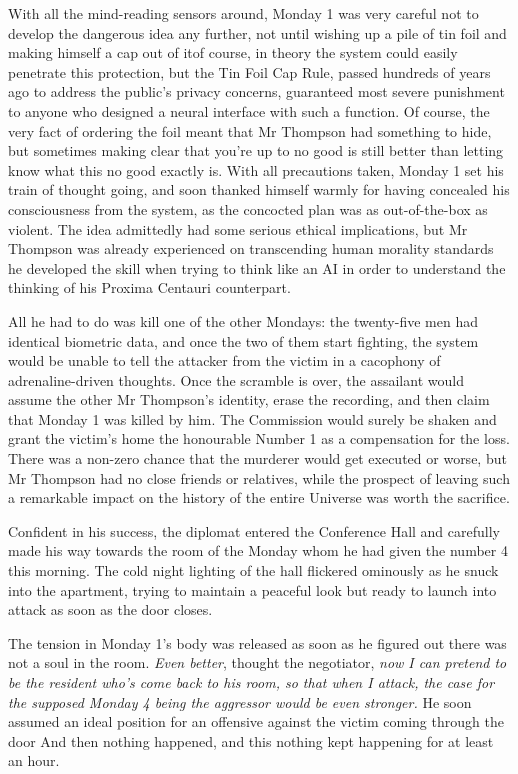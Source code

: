 With all the mind-reading sensors around, Monday 1 was very careful
not to develop the dangerous idea any further, not until wishing up a
pile of tin foil and making himself a cap out of it\textemdash of
course, in theory the system could easily penetrate this protection,
but the Tin Foil Cap Rule, passed hundreds of years ago to address the
public's privacy concerns, guaranteed most severe punishment to anyone
who designed a neural interface with such a function. Of course, the
very fact of ordering the foil meant that Mr Thompson had something to
hide, but sometimes making clear that you're up to no good is still
better than letting know what this no good exactly is.  With all
precautions taken, Monday 1 set his train of thought going, and soon
thanked himself warmly for having concealed his consciousness from the
system, as the concocted plan was as out-of-the-box as violent. The
idea admittedly had some serious ethical implications, but Mr Thompson
was already experienced on transcending human morality standards
\textemdash{} he developed the skill when trying to think like an AI
in order to understand the thinking of his Proxima Centauri
counterpart.

All he had to do was kill one of the other Mondays: the twenty-five
men had identical biometric data, and once the two of them start
fighting, the system would be unable to tell the attacker from the
victim in a cacophony of adrenaline-driven thoughts. Once the scramble
is over, the assailant would assume the other Mr Thompson's identity,
erase the recording, and then claim that Monday 1 was killed by
him. The Commission would surely be shaken and grant the victim's home
the honourable Number 1 as a compensation for the loss. There was a
non-zero chance that the murderer would get executed or worse, but Mr
Thompson had no close friends or relatives, while the prospect of
leaving such a remarkable impact on the history of the entire Universe
was worth the sacrifice.

Confident in his success, the diplomat entered the Conference Hall and
carefully made his way towards the room of the Monday whom he had
given the number 4 this morning. The cold night lighting of the hall
flickered ominously as he snuck into the apartment, trying to maintain
a peaceful look but ready to launch into attack as soon as the door
closes.

The tension in Monday 1's body was released as soon as he figured out
there was not a soul in the room. \textit{Even better}, thought the
negotiator, \textit{now I can pretend to be the resident who's come
back to his room, so that when I attack, the case for the supposed
Monday 4 being the aggressor would be even stronger.} He soon assumed
an ideal position for an offensive against the victim coming through
the door\textellipsis{} And then nothing happened, and this nothing kept
happening for at least an hour.

